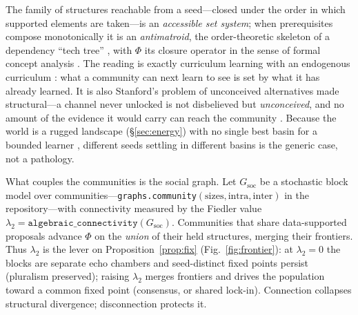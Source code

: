 \documentclass[11pt]{article}
\theoremstyle{definition}
\theoremstyle{plain}
\begin{document}
\noindent The family of structures reachable from a seed---closed under the order in which supported
elements are taken---is an \emph{accessible set system}; when prerequisites compose monotonically it
is an \emph{antimatroid}, the order-theoretic skeleton of a dependency ``tech tree''
\citep{kls1991,daveypriestley2002}, with $\Phi$ its closure operator in the sense of formal concept
analysis \citep{ganterwille1999}. The reading is exactly curriculum learning with an endogenous
curriculum \citep{bengio2009}: what a community can next learn to see is set by what it has already
learned. It is also Stanford's problem of unconceived alternatives made structural---a channel never
unlocked is not disbelieved but \emph{unconceived}, and no amount of the evidence it would carry can
reach the community \citep{stanford2006}. Because the world is a rugged landscape (\S\ref{sec:energy})
with no single best basin for a bounded learner \citep{kauffman1993,wolpertmacready1997}, different
seeds settling in different basins is the generic case, not a pathology.

What couples the communities is the social graph. Let $G_{\mathrm{soc}}$ be a stochastic block model
over communities---\texttt{graphs.community}$(\text{sizes},\text{intra},\text{inter})$ in the
repository---with connectivity measured by the Fiedler value
$\lambda_2=\texttt{algebraic\_connectivity}(G_{\mathrm{soc}})$. Communities that share
data-supported proposals advance $\Phi$ on the \emph{union} of their held structures, merging their
frontiers. Thus $\lambda_2$ is the lever on
Proposition~\ref{prop:fix} (Fig.~\ref{fig:frontier}): at $\lambda_2=0$ the blocks are
separate echo chambers and seed-distinct fixed points persist (pluralism preserved); raising
$\lambda_2$ merges frontiers and drives the population toward a common fixed point (consensus, or
shared lock-in). Connection collapses structural divergence; disconnection protects it.
\end{document}
